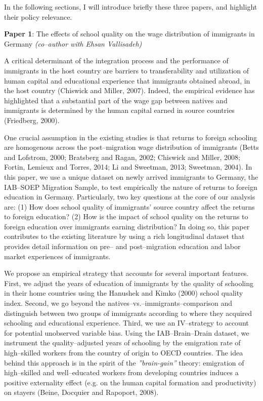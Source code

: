 \documentclass[a4paper, 11pt]{article} %
\begin{document}
In the following sections, I will introduce briefly these three papers, and highlight their policy relevance.

\vspace{15pt}

\textbf{Paper 1}: The effects of school quality on the wage distribution of immigrants in Germany \textit{ (co--author with Ehsan Vallisadeh)}

\vspace{15pt}

A critical determinant of the integration process and the performance of immigrants in the host country are barriers to transferability and utilization of human capital and educational experience that immigrants obtained abroad, in the host country (Chiswick and Miller, 2007). Indeed, the empirical evidence has highlighted that a substantial part of the wage gap between natives and immigrants is determined by the human capital earned in source countries (Friedberg, 2000).

One crucial assumption in the existing studies is that returns to foreign schooling are homogenous across the post--migration wage distribution of immigrants (Betts and Lofstrom, 2000; Bratsberg and Ragan, 2002; Chiswick and Miller, 2008; Fortin, Lemieux and Torres, 2014; Li and Sweetman, 2013; Sweetman, 2004). In this paper, we use a unique dataset on newly arrived immigrants to Germany, the IAB--SOEP Migration Sample, to test empirically the nature of returns to foreign education in Germany. Particularly, two key questions at the core of our analysis are: (1) How does school quality of immigrants' source country affect the returns to foreign education? (2) How is the impact of school quality on the returns to foreign education over immigrants earning distribution? In doing so, this paper contributes to the existing literature by using a rich longitudinal dataset that provides detail information on pre-- and post--migration education and labor market experiences of immigrants.

We propose an empirical strategy that accounts for several important features. First, we adjust the years of education of immigrants by the quality of schooling in their home countries using the Hanushek and Kimko (2000) school quality index. Second, we go beyond the natives--vs.--immigrants--comparison and distinguish between two groups of immigrants according to where they acquired schooling and educational experience. Third, we use an IV--strategy to account for potential unobserved variable bias. Using the IAB--Brain--Drain dataset, we instrument the quality--adjusted years of schooling by the emigration rate of high--skilled workers from the country of origin to OECD countries. The idea behind this approach is in the spirit of the \textit{''brain-gain''} theory: emigration of high--skilled and well--educated workers from developing countries induces a positive externality effect (e.g. on the human capital formation and productivity) on stayers (Beine, Docquier and Rapoport, 2008).
\end{document}
